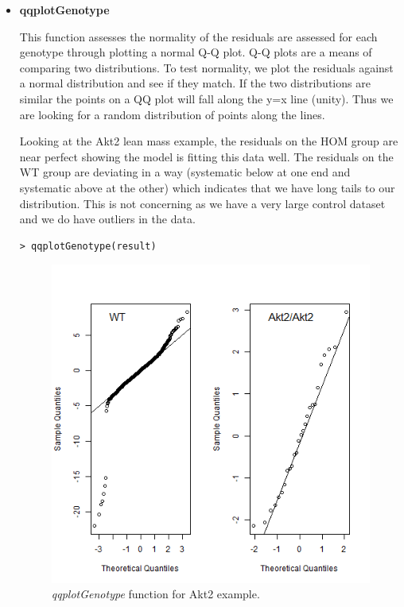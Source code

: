 \documentclass[12pt,a4paper]{article}
\begin{document}
\begin{itemize}
 \item \textbf{qqplotGenotype} 
 
This function assesses the normality of the residuals are assessed for each genotype through plotting a normal Q-Q plot. 
Q-Q plots are a means of comparing two distributions. To test normality, we plot the residuals against a normal distribution and see if they match. 
If the two distributions are similar the points on a QQ plot will fall along the y=x line (unity). Thus we are looking for a random distribution of points along the lines.  

Looking at the Akt2 lean mass example, the residuals on the HOM group are near perfect showing the model is fitting this data well.  
The residuals on the WT group are deviating in a way (systematic below at one end and systematic above at the other) which indicates that we have long tails to our distribution. 
This is not concerning as we have a very large control dataset and we do have outliers in the data.  

\begingroup
    \fontsize{8pt}{12pt}\selectfont
\begin{verbatim}
> qqplotGenotype(result)
\end{verbatim}
\endgroup 

\begin{figure}[H]%
\centerline{\includegraphics[scale=0.5]{cs1_qqplotGenotype.png}}
\caption{\textit{qqplotGenotype} function for Akt2 example.}\label{fig:16}
\end{figure}


\end{itemize}
\end{document}

